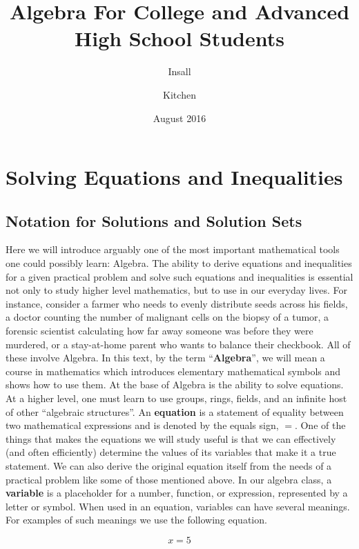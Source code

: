 \documentclass{book}
\title{Algebra
 For College and Advanced High School Students}
\author{Insall \and Kitchen }
\date{August 2016}
\theoremstyle{definition}
\begin{document}
\maketitle
\tableofcontents

\chapter{Solving Equations and Inequalities}

\section{Notation for Solutions and Solution Sets}

Here we will introduce arguably one of the most important mathematical tools one could possibly learn: Algebra. The ability to derive equations and inequalities for a given practical problem and solve such equations and inequalities is essential not only to study higher level mathematics, but to use in our everyday lives. For instance, consider a farmer who needs to evenly distribute seeds across his fields, a doctor counting the number of malignant cells on the biopsy of a tumor, a forensic scientist calculating how far away someone was before they were murdered, or a stay-at-home parent who wants to balance their checkbook. All of these involve Algebra.
In this text, by the term ``{\bf Algebra}'', we will mean a course in mathematics which introduces elementary mathematical symbols and shows how to use them. At the base of Algebra is the ability to solve equations. At a higher level, one must learn to use groups, rings, fields, and an infinite host of other ``algebraic structures''. 
An {\bf equation} is a statement of equality between two mathematical expressions and is denoted by the equals sign, $=$. One of the things that makes the equations we will study useful is that we can effectively (and often efficiently) determine the values of its variables that make it a true statement.  We can also derive the original equation itself from the needs of a practical problem like some of those mentioned above. In our algebra class, a {\bf variable} is a placeholder for a number, function, or expression, represented by a letter or symbol. When used in an equation, variables can have several meanings. For examples of such meanings we use the following equation.

\begin{equation}\label{(1)}
    x=5
\end{equation}
\end{document}
